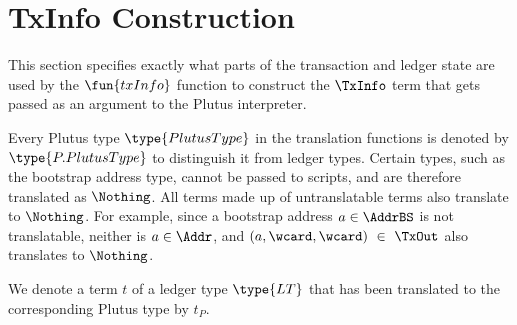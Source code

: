 \section{TxInfo Construction}
\label{sec:txinfo}

This section specifies exactly what parts of the transaction and ledger
state are used by the $\fun{txInfo}$ function to construct the
$\TxInfo$ term that gets passed as an
argument to the Plutus interpreter.

Every Plutus type $\type{PlutusType}$ in the translation functions is denoted
by $\type{P.PlutusType}$ to distinguish it from ledger types. Certain
types, such as the bootstrap address type, cannot be passed to scripts, and
are therefore translated as $\Nothing$. All terms made up of untranslatable
terms also translate to $\Nothing$. For example, since a bootstrap address $a \in \AddrBS$
is not translatable, neither is $a\in\Addr$, and $(a,\wcard,\wcard)~\in~\TxOut$
also translates to $\Nothing$.

We denote a term $t$ of a ledger type $\type{LT}$ that has been translated to the
corresponding Plutus type by $t_P$.


